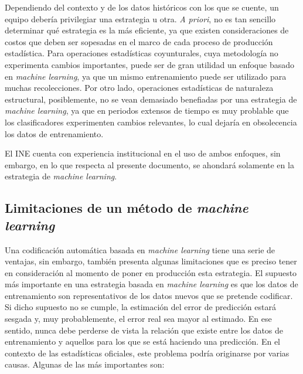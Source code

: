 \documentclass[
  12pt,
  spanish,
]{article}
\begin{document}
Dependiendo del contexto y de los datos históricos con los que se
cuente, un equipo debería privilegiar una estrategia u otra. \emph{A
priori}, no es tan sencillo determinar qué estrategia es la más
eficiente, ya que existen consideraciones de costos que deben ser
sopesadas en el marco de cada proceso de producción estadística. Para
operaciones estadísticas coyunturales, cuya metodología no experimenta
cambios importantes, puede ser de gran utilidad un enfoque basado en
\emph{machine learning}, ya que un mismo entrenamiento puede ser
utilizado para muchas recolecciones. Por otro lado, operaciones
estadísticas de naturaleza estructural, posiblemente, no se vean
demasiado benefiadas por una estrategia de \emph{machine learning}, ya
que en periodos extensos de tiempo es muy problable que los
clasificadores experimenten cambios relevantes, lo cual dejaría en
obsolecencia los datos de entrenamiento.

El INE cuenta con experiencia institucional en el uso de ambos enfoques,
sin embargo, en lo que respecta al presente documento, se ahondará
solamente en la estrategia de \emph{machine learning}.

\hypertarget{limitaciones-de-un-muxe9todo-de-machine-learning}{%
\subsection{\texorpdfstring{Limitaciones de un método de \emph{machine
learning}}{Limitaciones de un método de machine learning}}\label{limitaciones-de-un-muxe9todo-de-machine-learning}}

Una codificación automática basada en \emph{machine learning} tiene una
serie de ventajas, sin embargo, también presenta algunas limitaciones
que es preciso tener en consideración al momento de poner en producción
esta estrategia. El supuesto más importante en una estrategia basada en
\emph{machine learning} es que los datos de entrenamiento son
representativos de los datos nuevos que se pretende codificar. Si dicho
supuesto no se cumple, la estimación del error de predicción estará
sesgada y, muy probablemente, el error real sea mayor al estimado. En
ese sentido, nunca debe perderse de vista la relación que existe entre
los datos de entrenamiento y aquellos para los que se está haciendo una
predicción. En el contexto de las estadísticas oficiales, este problema
podría originarse por varias causas. Algunas de las más importantes son:
\end{document}
